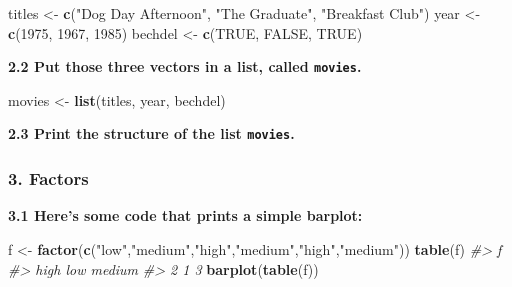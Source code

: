 \documentclass[]{book}
\newenvironment{Shaded}{\begin{snugshade}}{\end{snugshade}}
\newcommand{\KeywordTok}[1]{\textcolor[rgb]{0.13,0.29,0.53}{\textbf{#1}}}
\newcommand{\DecValTok}[1]{\textcolor[rgb]{0.00,0.00,0.81}{#1}}
\newcommand{\StringTok}[1]{\textcolor[rgb]{0.31,0.60,0.02}{#1}}
\newcommand{\CommentTok}[1]{\textcolor[rgb]{0.56,0.35,0.01}{\textit{#1}}}
\newcommand{\OtherTok}[1]{\textcolor[rgb]{0.56,0.35,0.01}{#1}}
\newcommand{\NormalTok}[1]{#1}
\begin{document}
\begin{Shaded}
\begin{Highlighting}[]
\NormalTok{titles <-}\StringTok{ }\KeywordTok{c}\NormalTok{(}\StringTok{"Dog Day Afternoon"}\NormalTok{, }\StringTok{"The Graduate"}\NormalTok{, }\StringTok{"Breakfast Club"}\NormalTok{)}
\NormalTok{year <-}\StringTok{ }\KeywordTok{c}\NormalTok{(}\DecValTok{1975}\NormalTok{, }\DecValTok{1967}\NormalTok{, }\DecValTok{1985}\NormalTok{)}
\NormalTok{bechdel <-}\StringTok{ }\KeywordTok{c}\NormalTok{(}\OtherTok{TRUE}\NormalTok{, }\OtherTok{FALSE}\NormalTok{, }\OtherTok{TRUE}\NormalTok{)}
\end{Highlighting}
\end{Shaded}

\textbf{2.2 Put those three vectors in a list, called \texttt{movies}.}

\begin{Shaded}
\begin{Highlighting}[]
\NormalTok{movies <-}\StringTok{ }\KeywordTok{list}\NormalTok{(titles, year, bechdel)}
\end{Highlighting}
\end{Shaded}

\textbf{2.3 Print the structure of the list \texttt{movies}.}

\begin{Shaded}
\end{Shaded}

\subsubsection*{3. Factors}\label{factors-1}

\textbf{3.1 Here's some code that prints a simple barplot:}

\begin{Shaded}
\begin{Highlighting}[]
\NormalTok{f <-}\StringTok{ }\KeywordTok{factor}\NormalTok{(}\KeywordTok{c}\NormalTok{(}\StringTok{"low"}\NormalTok{,}\StringTok{"medium"}\NormalTok{,}\StringTok{"high"}\NormalTok{,}\StringTok{"medium"}\NormalTok{,}\StringTok{"high"}\NormalTok{,}\StringTok{"medium"}\NormalTok{))}
\KeywordTok{table}\NormalTok{(f)}
\CommentTok{#> f}
\CommentTok{#>   high    low medium }
\CommentTok{#>      2      1      3}
\KeywordTok{barplot}\NormalTok{(}\KeywordTok{table}\NormalTok{(f))}
\end{Highlighting}
\end{Shaded}
\end{document}
